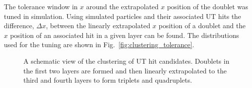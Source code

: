 The tolerance window in $x$ around the extrapolated $x$ position of the doublet was tuned in simulation. Using simulated particles and their associated UT hits the difference, $\Delta x$, between the linearly extrapolated $x$ position of a doublet and the $x$ position of an associated hit in a given layer can be found. The distributions used for the tuning are shown in Fig.~\ref{fig:clustering_tolerance}.

\begin{figure}[!htb]
 \begin{center}

\caption{A schematic view of the clustering of UT hit candidates. Doublets in the first two layers are formed and then linearly extrapolated to the third and fourth layers to form triplets and quadruplets.}
\label{fig:clustering}
\end{center}
\end{figure}

